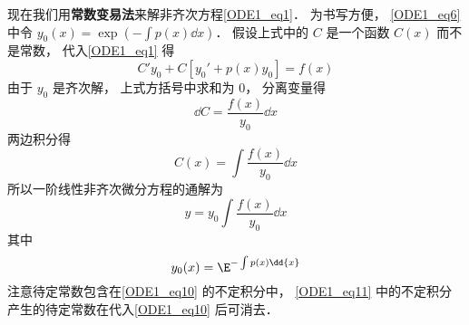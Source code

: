 现在我们用\textbf{常数变易法}来解非齐次方程\autoref{ODE1_eq1}． 为书写方便， \autoref{ODE1_eq6} 中令 $y_0(x) = \exp(-\int p(x) \dd{x})$． 假设上式中的 $C$ 是一个函数 $C(x)$ 而不是常数， 代入\autoref{ODE1_eq1} 得
\begin{equation}
C'y_0 + C[y_0' + p(x)y_0] = f(x)
\end{equation}
由于 $y_0$ 是齐次解， 上式方括号中求和为 0， 分离变量得
\begin{equation}
\dd{C}= \frac{f(x)}{y_0} \dd{x}
\end{equation}
两边积分得
\begin{equation}
C(x) = \int \frac{f(x)}{y_0} \dd{x}
\end{equation}
所以一阶线性非齐次微分方程的通解为
\begin{equation}\label{ODE1_eq10}
y = y_0  \int \frac{f(x)}{y_0} \dd{x}
\end{equation}
其中
\begin{equation}\label{ODE1_eq11}
y_0(x) = \E^{-\int p(x) \dd{x}}
\end{equation}
注意待定常数包含在\autoref{ODE1_eq10} 的不定积分中， \autoref{ODE1_eq11} 中的不定积分产生的待定常数在代入\autoref{ODE1_eq10} 后可消去．
